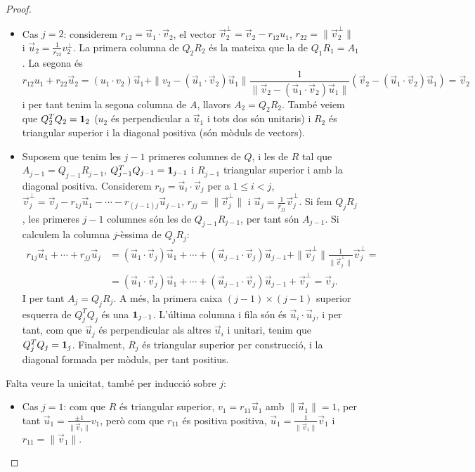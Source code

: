 \begin{proof}
\begin{itemize}
    \item Cas $j=2$: considerem $r_{12}=\vec u_1\cdot \vec v_2$, el vector $\vec v_2^\perp=\vec v_2-r_{12}u_1$, $r_{22}=\|\vec v_2^\perp\|$ i $\vec u_2=\frac{1}{r_{22}} v_2^\perp$. La primera columna de $Q_2R_2$ és la mateixa que la de $Q_1R_1=A_1$. La segona és
    \[
    r_{12}u_1+r_{22}\vec u_2=(u_1\cdot v_2)\vec u_1+\|v_2-(\vec u_1\cdot \vec v_2)\vec u_1\|\frac{1}{\|\vec v_2-(\vec u_1\cdot \vec v_2)\vec u_1\|}(\vec v_2-(\vec u_1\cdot \vec v_2)\vec u_1)=\vec v_2
    \]
    i per tant tenim la segona columna de $A$, llavors $A_2=Q_2R_2$. També veiem que $Q_2^TQ_2=\mathbf{1}_2$ ($u_2$ és perpendicular a $\vec u_1$ i tots dos són unitaris) i $R_2$ és triangular superior i la diagonal positiva (són mòduls de vectors).
    \item Suposem que tenim les $j-1$ primeres columnes de $Q$, i les de $R$ tal que $A_{j-1}=Q_{j-1}R_{j-1}$, $Q_{j-1}^TQ_{j-1}=\mathbf{1}_{j-1}$ i $R_{j-1}$ triangular superior i amb la diagonal positiva. Considerem $r_{ij}=\vec u_i\cdot \vec v_j$ per a $1\leq i <j$, $\vec v_j^\perp=\vec v_j-r_{1j}\vec u_1-\cdots-r_{(j-1)j}\vec u_{j-1}$, $r_{jj}=\|\vec v_j^\perp\|$ i $\vec u_j=\frac{1}{r_{jj}} \vec v_j^\perp$. Si fem $Q_jR_j$, les primeres $j-1$ columnes són les de $Q_{j-1}R_{j-1}$, per tant són $A_{j-1}$. Si calculem la columna $j$-èssima de $Q_jR_j$:
    \begin{align*}
     r_{1j}\vec u_1+\cdots+r_{jj}\vec u_j & =(\vec u_1\cdot \vec v_j)\vec u_1+\cdots+(\vec u_{j-1}\cdot \vec v_j)\vec u_{j-1}+\|\vec v_j^\perp\|\frac{1}{\|\vec v_j^\perp\|} \vec v_j^\perp = \\
     & =(\vec u_1\cdot \vec v_j)\vec u_1+\cdots+(\vec u_{j-1}\cdot \vec v_j)\vec u_{j-1}+ \vec v_j^\perp=\vec v_j .
    \end{align*}
    I per tant $A_j=Q_jR_j$. A més, la primera caixa $(j-1)\times(j-1)$ superior esquerra de $Q_j^TQ_j$ és una $\mathbf{1}_{j-1}$. L'última columna i fila són és $\vec u_i\cdot \vec u_j$, i per tant, com que $\vec u_j$ és perpendicular als altres $\vec u_i$ i unitari, tenim que $Q_j^TQ_j=\mathbf{1}_j$. Finalment, $R_j$ és triangular superior per construcció, i la diagonal formada per mòduls, per tant positius.
\end{itemize}
Falta veure la unicitat, també per inducció sobre $j$:
\begin{itemize}
    \item Cas $j=1$: com que $R$ és triangular superior, $v_1=r_{11}\vec u_1$ amb $\|\vec u_1\|=1$, per tant $\vec u_1=\frac{\pm1}{\|\vec v_1\|}v_1$, però com que $r_{11}$ és positiva positiva, $\vec u_1=\frac{1}{\|\vec v_1\|}\vec v_1$ i $r_{11}=\|\vec v_1\|$.

\end{itemize}
\end{proof}
